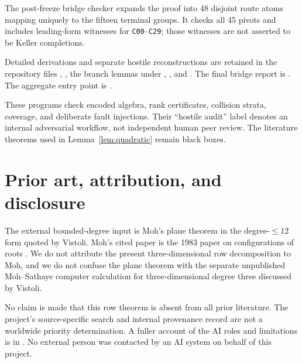 \documentclass[11pt]{article}
\theoremstyle{remark}
\begin{document}
The post-freeze bridge checker expands the proof into 48 disjoint route
atoms mapping uniquely to the fifteen terminal groups.  It checks all 45
pivots and includes leading-form witnesses for \texttt{C00}--\texttt{C29};
those witnesses are not asserted to be Keller completions.

Detailed derivations and separate hostile reconstructions are retained in
the repository files
,
,
the branch lemmas under ,
, and
.  The final bridge report is
.
The aggregate entry point is .

These programs check encoded algebra, rank certificates, collision strata,
coverage, and deliberate fault injections.  Their ``hostile audit'' label
denotes an internal adversarial workflow, not independent human peer review.
The literature theorems used in Lemma~\ref{lem:quadratic} remain black
boxes.

\section{Prior art, attribution, and disclosure}

The external bounded-degree input is Moh's plane theorem in the
degree-$\le12$ form quoted by Vistoli.  Moh's cited paper is the 1983 paper
on configurations of roots \cite{Moh}.  We do not attribute the present
three-dimensional row decomposition to Moh, and we do not confuse the plane
theorem with the separate unpublished Moh--Sathaye computer calculation for
three-dimensional degree three discussed by Vistoli.

No claim is made that this row theorem is absent from all prior literature.
The project's source-specific search and internal provenance record are not
a worldwide priority determination.  A fuller account of the AI roles and
limitations is in .  No external person was contacted
by an AI system on behalf of this project.
\end{document}

